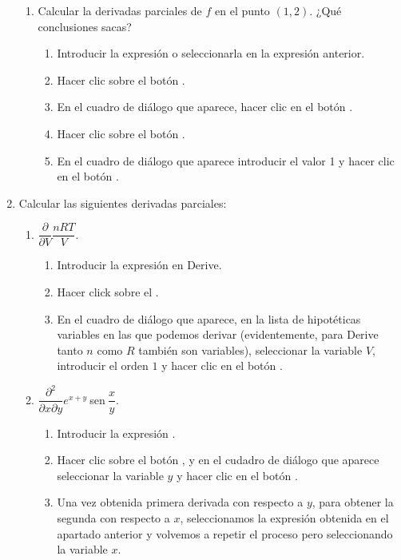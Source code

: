 \begin{enumerate}[leftmargin=*]
\begin{enumerate}
\item Calcular la derivadas parciales de $f$ en el punto $(1,2)$. ¿Qué conclusiones sacas?
\begin{indicacion}
{
\begin{enumerate}
\item Introducir la expresión  o seleccionarla en la expresión anterior. 
\item Hacer clic sobre el botón .
\item En el cuadro de diálogo que aparece, hacer clic en el botón .
\item Hacer clic sobre el botón .
\item En el cuadro de diálogo que aparece introducir el valor 1 y hacer clic en el botón .
\end{enumerate}
}
\end{indicacion}
\end{enumerate}


\item  Calcular las siguientes derivadas parciales:
\begin{enumerate}
\item  $\dfrac{\partial }{\partial V}\dfrac{nRT}{V}.$

\begin{indicacion}
{
\begin{enumerate}
\item Introducir la expresión en Derive.
\item Hacer click sobre el .
\item En el cuadro de diálogo que aparece, en la lista de hipotéticas variables en las que podemos derivar
(evidentemente, para Derive tanto $n$ como $R$ también son variables), seleccionar la variable $V$, introducir el orden
$1$ y hacer clic en el botón .
\end{enumerate}
}
\end{indicacion}

\item  $\dfrac{\partial ^{2}}{\partial x\partial y}e^{x+y}\ $sen$\ \dfrac{x}{y}.$
\begin{indicacion}
{\begin{enumerate}
\item Introducir la expresión .
\item Hacer clic sobre el botón , y en el cudadro de diálogo que aparece
seleccionar la variable $y$ y hacer clic en el botón .
\item Una vez obtenida primera derivada con respecto a $y$, para obtener la segunda con respecto a $x$, seleccionamos la
expresión obtenida en el apartado anterior y volvemos a repetir el proceso pero seleccionando la variable
$x$.
\end{enumerate}
}
\end{indicacion}
\end{enumerate}


\end{enumerate}
